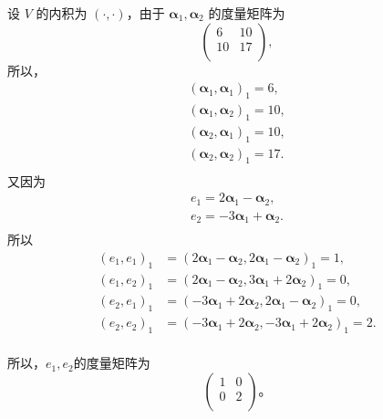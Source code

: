 \begin{enumerate}[1~]
\begin{enumerate}[1.~]
\begin{solution}
设 $V$ 的内积为 $(\cdot, \cdot)$，由于 $\boldsymbol{\alpha}_1, \boldsymbol{\alpha}_2$ 的度量矩阵为
$$\left( \begin{matrix}
	6&		10\\
	10&		17\\
\end{matrix} \right),$$
所以，
$$
\begin{array}{l}
	\left( \boldsymbol{\alpha} _1,\boldsymbol{\alpha} _1 \right) _1=6,\\
	\left( \boldsymbol{\alpha} _1,\boldsymbol{\alpha} _2 \right) _1=10,\\
	\left( \boldsymbol{\alpha} _2,\boldsymbol{\alpha} _1 \right) _1=10,\\
	\left( \boldsymbol{\alpha} _2,\boldsymbol{\alpha} _2 \right) _1=17.\\
\end{array}
$$
又因为
$$
\begin{array}{l}
	e_1 = 2 \boldsymbol{\alpha} _1 - \boldsymbol{\alpha} _2,\\
	e_2 = -3 \boldsymbol{\alpha} _1 + \boldsymbol{\alpha} _2 .\\
\end{array}
$$
所以
\begin{align*}
(e_1, e_1)_1 &= (2 \boldsymbol{\alpha}_1- \boldsymbol{\alpha}_2, 2 \boldsymbol{\alpha}_1- \boldsymbol{\alpha}_2)_1 = 1,\\
(e_1, e_2)_1 &= (2 \boldsymbol{\alpha}_1- \boldsymbol{\alpha}_2, 3\boldsymbol{\alpha}_1 +2\boldsymbol{\alpha}_2)_1 = 0,\\
(e_2, e_1)_1 &= (-3 \boldsymbol{\alpha}_1+ 2\boldsymbol{\alpha}_2, 2 \boldsymbol{\alpha}_1- \boldsymbol{\alpha}_2)_1 = 0,\\
(e_2, e_2)_1 &= (-3 \boldsymbol{\alpha}_1+ 2\boldsymbol{\alpha}_2, -3 \boldsymbol{\alpha}_1+2 \boldsymbol{\alpha}_2)_1 = 2.\\
\end{align*}

所以，$e_1, e_2$的度量矩阵为$$
\left( \begin{matrix}
	1&		0\\
	0&		2\\
\end{matrix} \right) 。
$$
\end{solution}
\end{enumerate}


\end{enumerate}
